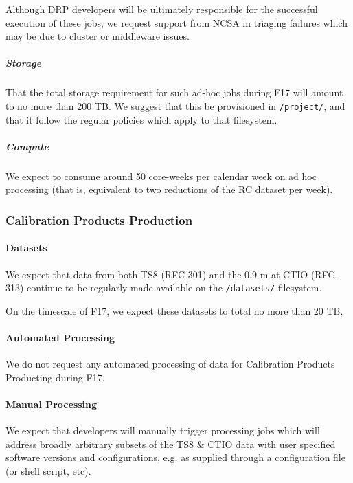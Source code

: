 Although DRP developers will be ultimately responsible for the
successful execution of these jobs, we request support from NCSA in
triaging failures which may be due to cluster or middleware issues.

\subparagraph{Storage}\label{storage}

That the total storage requirement for such ad-hoc jobs during F17 will
amount to no more than 200 TB. We suggest that this be provisioned in
\texttt{/project/}, and that it follow the regular policies which apply
to that filesystem.

\subparagraph{Compute}\label{compute}

We expect to consume around 50 core-weeks per calendar week on ad hoc
processing (that is, equivalent to two reductions of the RC dataset per
week).

\subsubsection{Calibration Products
Production}\label{calibration-products-production}

\paragraph{Datasets}\label{datasets-1}

We expect that data from both TS8 (RFC-301) and the 0.9 m at CTIO
(RFC-313) continue to be regularly made available on the
\texttt{/datasets/} filesystem.

On the timescale of F17, we expect these datasets to total no more than
20 TB.

\paragraph{Automated Processing}\label{automated-processing-1}

We do not request any automated processing of data for Calibration
Products Producting during F17.

\paragraph{Manual Processing}\label{manual-processing-1}

We expect that developers will manually trigger processing jobs which
will address broadly arbitrary subsets of the TS8 \& CTIO data with user
specified software versions and configurations, e.g. as supplied through
a configuration file (or shell script, etc).

